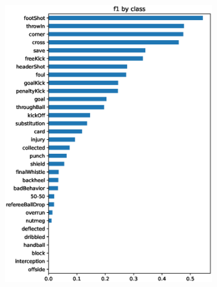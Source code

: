 \begin{figure}
\begin{subfigure}{.24\textwidth}
        \includegraphics[width=0.99\textwidth, keepaspectratio, interpolate]{img/07_f1_by_class_test_202012-2218-2841.eps}
    \end{subfigure}
    \begin{subfigure}{.24\textwidth}
        \centering

\end{subfigure}
\end{figure}
